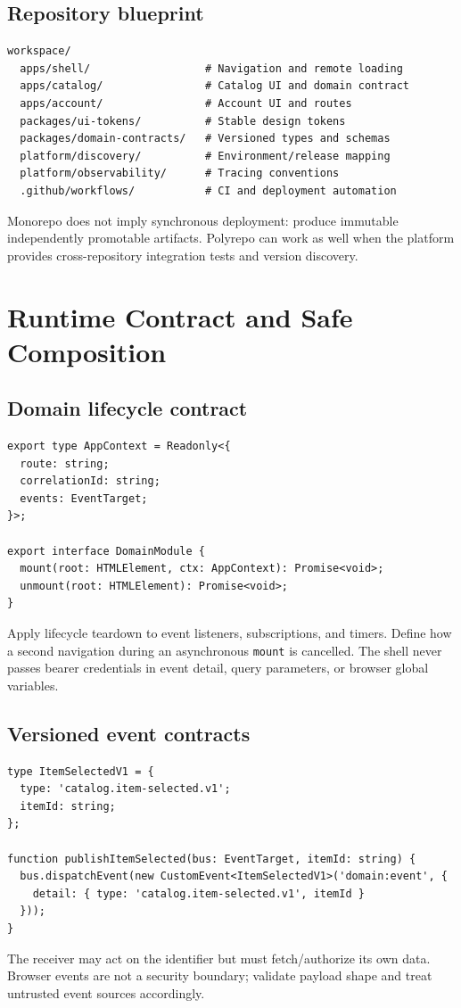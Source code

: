 \documentclass[11pt,letterpaper,oneside]{report}
\begin{document}
\section{Repository blueprint}
\begin{lstlisting}[caption={Illustrative monorepo layout}]
workspace/
  apps/shell/                  # Navigation and remote loading
  apps/catalog/                # Catalog UI and domain contract
  apps/account/                # Account UI and routes
  packages/ui-tokens/          # Stable design tokens
  packages/domain-contracts/   # Versioned types and schemas
  platform/discovery/          # Environment/release mapping
  platform/observability/      # Tracing conventions
  .github/workflows/           # CI and deployment automation
\end{lstlisting}
Monorepo does not imply synchronous deployment: produce immutable independently promotable artifacts. Polyrepo can work as well when the platform provides cross-repository integration tests and version discovery.
\chapter{Runtime Contract and Safe Composition}
\section{Domain lifecycle contract}
\begin{lstlisting}[caption={TypeScript interface for a client-side domain}]
export type AppContext = Readonly<{
  route: string;
  correlationId: string;
  events: EventTarget;
}>;

export interface DomainModule {
  mount(root: HTMLElement, ctx: AppContext): Promise<void>;
  unmount(root: HTMLElement): Promise<void>;
}
\end{lstlisting}
Apply lifecycle teardown to event listeners, subscriptions, and timers. Define how a second navigation during an asynchronous \texttt{mount} is cancelled. The shell never passes bearer credentials in event detail, query parameters, or browser global variables.
\section{Versioned event contracts}
\begin{lstlisting}[caption={Typed application event with minimal payload}]
type ItemSelectedV1 = {
  type: 'catalog.item-selected.v1';
  itemId: string;
};

function publishItemSelected(bus: EventTarget, itemId: string) {
  bus.dispatchEvent(new CustomEvent<ItemSelectedV1>('domain:event', {
    detail: { type: 'catalog.item-selected.v1', itemId }
  }));
}
\end{lstlisting}
The receiver may act on the identifier but must fetch/authorize its own data. Browser events are not a security boundary; validate payload shape and treat untrusted event sources accordingly.
\end{document}
